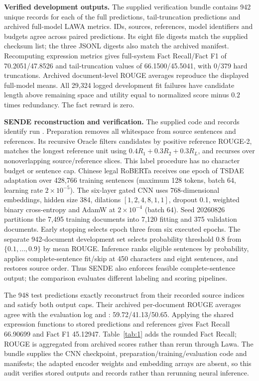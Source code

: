 \documentclass[10pt,twocolumn,letterpaper]{article}
\begin{document}
\textbf{Verified development outputs.} The supplied verification bundle contains 942 unique records for each of the full predictions, tail-truncation predictions and archived full-model LAWA metrics. IDs, sources, references, model identifiers and budgets agree across paired predictions. Its eight file digests match the supplied checksum list; the three JSONL digests also match the archived manifest. Recomputing expression metrics gives full-system Fact Recall/Fact F1 of 70.2051/47.8526 and tail-truncation values of 66.1500/45.5041, with 0/379 hard truncations. Archived document-level ROUGE averages reproduce the displayed full-model means. All 29,324 logged development fit failures have candidate length above remaining space and utility equal to normalized score minus $0.2$ times redundancy. The fact reward is zero.

\textbf{SENDE reconstruction and verification.} The supplied code and records identify run . Preparation removes all whitespace from source sentences and references. Its recursive Oracle filters candidates by positive reference ROUGE-2, matches the longest reference unit using $0.4R_1+0.3R_2+0.3R_L$, and recurses over nonoverlapping source/reference slices. This label procedure has no character budget or sentence cap. Chinese legal RoBERTa receives one epoch of TSDAE adaptation over 428,766 training sentences (maximum 128 tokens, batch 64, learning rate $2\times10^{-5}$). The six-layer gated CNN uses 768-dimensional embeddings, hidden size 384, dilations $[1,2,4,8,1,1]$, dropout 0.1, weighted binary cross-entropy and AdamW at $2\times10^{-4}$ (batch 64). Seed 20260826 partitions the 7,495 training documents into 7,120 fitting and 375 validation documents. Early stopping selects epoch three from six executed epochs. The separate 942-document development set selects probability threshold 0.8 from $\{0.1,\ldots,0.9\}$ by mean ROUGE. Inference ranks eligible sentences by probability, applies complete-sentence fit/skip at 450 characters and eight sentences, and restores source order. Thus SENDE also enforces feasible complete-sentence output; the comparison evaluates different labeling and scoring pipelines.

The 948 test predictions exactly reconstruct from their recorded source indices and satisfy both output caps. Their archived per-document ROUGE averages agree with the evaluation log and : 59.72/41.13/50.65. Applying the shared expression functions to stored predictions and references gives Fact Recall 66.90699 and Fact F1 45.12947. Table~\ref{tab:1} adds the rounded Fact Recall; ROUGE is aggregated from archived scores rather than rerun through Lawa. The bundle supplies the CNN checkpoint, preparation/training/evaluation code and manifests; the adapted encoder weights and embedding arrays are absent, so this audit verifies stored outputs and records rather than rerunning neural inference.
\end{document}
